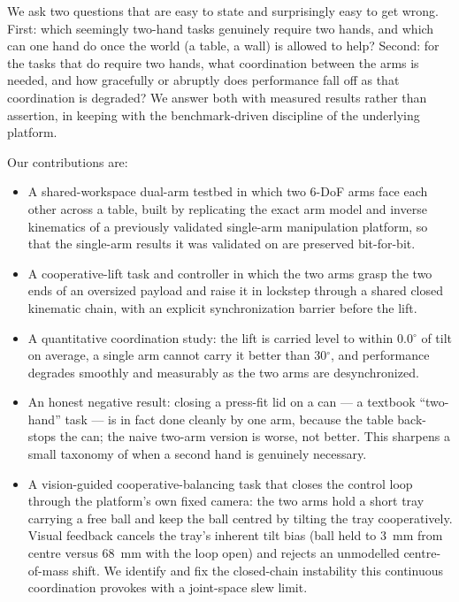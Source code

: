 \documentclass[runningheads]{llncs}
\begin{document}
We ask two questions that are easy to state and surprisingly easy to get wrong. First: which seemingly two-hand tasks genuinely require two hands, and which can one hand do once the world (a table, a wall) is allowed to help? Second: for the tasks that do require two hands, what coordination between the arms is needed, and how gracefully or abruptly does performance fall off as that coordination is degraded? We answer both with measured results rather than assertion, in keeping with the benchmark-driven discipline of the underlying platform.

Our contributions are:

\begin{itemize}

\item A shared-workspace dual-arm testbed in which two 6-DoF arms face each other across a table, built by replicating the exact arm model and inverse kinematics of a previously validated single-arm manipulation platform, so that the single-arm results it was validated on are preserved bit-for-bit.

\item A cooperative-lift task and controller in which the two arms grasp the two ends of an oversized payload and raise it in lockstep through a shared closed kinematic chain, with an explicit synchronization barrier before the lift.

\item A quantitative coordination study: the lift is carried level to within 0.0$^\circ$ of tilt on average, a single arm cannot carry it better than 30$^\circ$, and performance degrades smoothly and measurably as the two arms are desynchronized.

\item An honest negative result: closing a press-fit lid on a can --- a textbook ``two-hand'' task --- is in fact done cleanly by one arm, because the table back-stops the can; the naive two-arm version is worse, not better. This sharpens a small taxonomy of when a second hand is genuinely necessary.

\item A vision-guided cooperative-balancing task that closes the control loop through the platform's own fixed camera: the two arms hold a short tray carrying a free ball and keep the ball centred by tilting the tray cooperatively. Visual feedback cancels the tray's inherent tilt bias (ball held to 3~mm from centre versus 68~mm with the loop open) and rejects an unmodelled centre-of-mass shift. We identify and fix the closed-chain instability this continuous coordination provokes with a joint-space slew limit.

\end{itemize}
\end{document}
